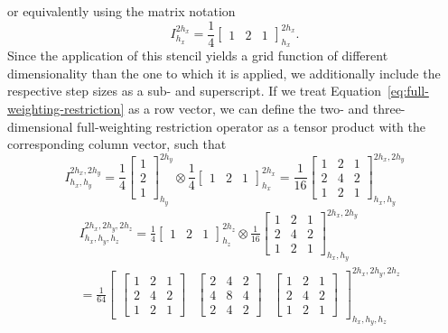 or equivalently using the matrix notation
\begin{equation}
	I_{h_x}^{2h_x} =  \frac{1}{4} \begin{bmatrix}
			1 & 2 & 1
		\end{bmatrix}_{h_x}^{2h_x}.
	\label{eq:full-weighting-restriction}
\end{equation} 
Since the application of this stencil yields a grid function of different dimensionality than the one to which it is applied, we additionally include the respective step sizes as a sub- and superscript.
If we treat Equation~\eqref{eq:full-weighting-restriction} as a row vector, we can define the two- and three-dimensional full-weighting restriction operator as a tensor product with the corresponding column vector, such that
\begin{equation}
	I^{2h_x, 2h_y}_{h_x, h_y} = \frac{1}{4} \begin{bmatrix}
		1 \\ 2 \\ 1
	\end{bmatrix}_{h_y}^{2h_y} \otimes \frac{1}{4} \begin{bmatrix}
		1 & 2 & 1
	\end{bmatrix}_{h_x}^{2h_x} =
\frac{1}{16} 
\begin{bmatrix}
	1 & 2 & 1 \\
	2 & 4 & 2 \\
	1 & 2 & 1
\end{bmatrix}^{2h_x, 2h_y}_{h_x, h_y}
\end{equation} 
\begin{equation}
\begin{split}
	& I^{2h_x, 2h_y, 2h_z}_{h_x, h_y, h_z} = \frac{1}{4} \begin{bmatrix}
		1 & 2 & 1
	\end{bmatrix}_{h_z}^{2h_z} \otimes 
	\frac{1}{16} 
	\begin{bmatrix}
		1 & 2 & 1 \\
		2 & 4 & 2 \\
		1 & 2 & 1
	\end{bmatrix}^{2h_x, 2h_y}_{h_x, h_y} \\
& = \frac{1}{64} \begin{bmatrix}
\begin{bmatrix}
	1 & 2 & 1 \\
	2 & 4 & 2 \\
	1 & 2 & 1
\end{bmatrix} &	\begin{bmatrix}
2 & 4 & 2 \\
4 & 8 & 4 \\
2 & 4 & 2
\end{bmatrix} &
\begin{bmatrix}
	1 & 2 & 1 \\
	2 & 4 & 2 \\
	1 & 2 & 1
\end{bmatrix}
\end{bmatrix}^{2h_x, 2h_y, 2h_z}_{h_x, h_y, h_z}
\end{split}
\end{equation}
